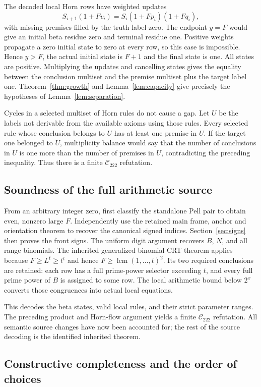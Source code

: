 \documentclass[11pt,a4paper]{article}
\theoremstyle{remark}\newtheorem{remark}[theorem]{Remark}
\newcommand{\Ccal}{\mathcal C_{222}}
\begin{document}
The decoded local Horn rows have weighted updates
\[
S_{i+1}(1+Fv_i)=S_i(1+Fp_i)(1+Fq_i),
\]
with missing premises filled by the truth label zero. The endpoint $y=F$
would give an initial beta residue zero and terminal residue one. Positive
weights propagate a zero initial state to zero at every row, so this case
is impossible. Hence $y>F$, the actual initial state is $F+1$ and the final
state is one. All states are positive. Multiplying the updates and cancelling
states gives the equality between the conclusion multiset and the premise
multiset plus the target label one. Theorem~\ref{thm:growth} and
Lemma~\ref{lem:capacity} give precisely the hypotheses of
Lemma~\ref{lem:separation}.

Cycles in a selected multiset of Horn rules do not cause a gap. Let $U$ be
the labels not derivable from the available axioms using those rules. Every
selected rule whose conclusion belongs to $U$ has at least one premise in
$U$. If the target one belonged to $U$, multiplicity balance would say
that the number of conclusions in $U$ is one more than the number of
premises in $U$, contradicting the preceding inequality. Thus there is a
finite $\Ccal$ refutation.

\subsection{Soundness of the full arithmetic source}

From an arbitrary integer zero, first classify the standalone Pell pair to
obtain even, nonzero large $F$. Independently use the retained main frame,
anchor and orientation theorem to recover the canonical signed indices.
Section~\ref{sec:signs} then proves the front signs. The uniform digit
argument recovers $B$, $N$, and all range binomials. The inherited generalized
binomial-CRT theorem applies because $F\ge L^t\ge t^t$ and hence
$F\ge\operatorname{lcm}(1,\ldots,t)^2$. Its two required conclusions are
retained: each row has a full prime-power selector exceeding $t$, and every
full prime power of $B$ is assigned to some row. The local arithmetic bound
below $2^x$ converts those congruences into actual local equations.

This decodes the beta states, valid local rules, and their strict parameter
ranges. The preceding product and Horn-flow argument yields a finite
$\Ccal$ refutation. All semantic source changes have now been accounted for;
the rest of the source decoding is the identified inherited theorem.

\subsection{Constructive completeness and the order of choices}
\end{document}
